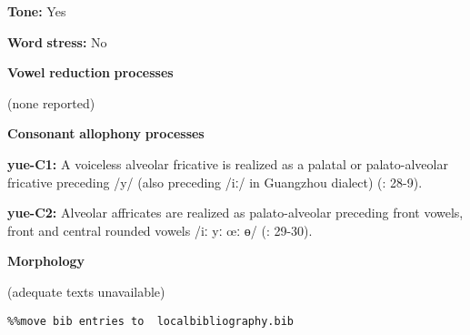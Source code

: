 \begin{styleBody}
\textbf{Tone:} Yes
\end{styleBody}

\begin{styleBody}
\textbf{Word} \textbf{stress:} No
\end{styleBody}

\begin{styleBody}
\textbf{Vowel} \textbf{reduction} \textbf{processes}
\end{styleBody}

\begin{styleBody}
(none reported)
\end{styleBody}

\begin{styleBody}
\textbf{Consonant} \textbf{allophony} \textbf{processes}
\end{styleBody}

\begin{styleBody}
\textbf{yue-C1:} A voiceless alveolar fricative is realized as a palatal or palato-alveolar fricative preceding /y/ (also preceding /iː/ in Guangzhou dialect) (\citealt{BauerBenedict1997}: 28-9).
\end{styleBody}

\begin{styleBody}
\textbf{yue-C2:} Alveolar affricates are realized as palato-alveolar preceding front vowels, front and central rounded vowels /iː yː œː ɵ/ (\citealt{BauerBenedict1997}: 29-30).
\end{styleBody}

\begin{styleBody}
\textbf{Morphology}
\end{styleBody}

\begin{styleBody}
(adequate texts unavailable)
\end{styleBody}

\begin{verbatim}%%move bib entries to  localbibliography.bib
\end{verbatim}